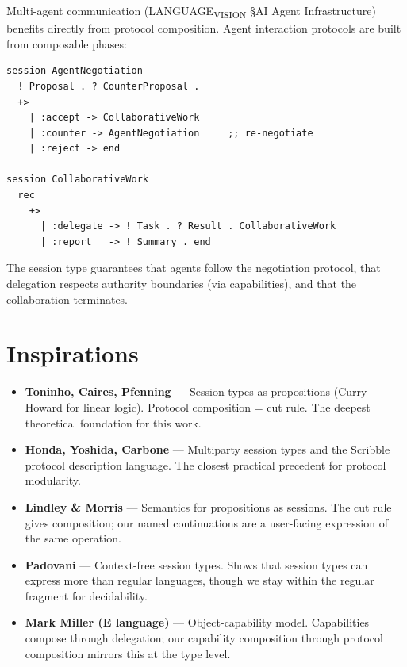 \documentclass[11pt]{article}
\begin{document}
Multi-agent communication (LANGUAGE\textsubscript{VISION} §AI Agent Infrastructure) benefits
directly from protocol composition. Agent interaction protocols are built from
composable phases:

\begin{verbatim}
session AgentNegotiation
  ! Proposal . ? CounterProposal .
  +>
    | :accept -> CollaborativeWork
    | :counter -> AgentNegotiation     ;; re-negotiate
    | :reject -> end

session CollaborativeWork
  rec
    +>
      | :delegate -> ! Task . ? Result . CollaborativeWork
      | :report   -> ! Summary . end
\end{verbatim}

The session type guarantees that agents follow the negotiation protocol, that
delegation respects authority boundaries (via capabilities), and that the
collaboration terminates.
\section{Inspirations}
\label{sec:orga29a86d}

\begin{itemize}
\item \textbf{Toninho, Caires, Pfenning} --- Session types as propositions (Curry-Howard
for linear logic). Protocol composition = cut rule. The deepest theoretical
foundation for this work.
\item \textbf{Honda, Yoshida, Carbone} --- Multiparty session types and the Scribble
protocol description language. The closest practical precedent for protocol
modularity.
\item \textbf{Lindley \& Morris} --- Semantics for propositions as sessions. The cut rule
gives composition; our named continuations are a user-facing expression
of the same operation.
\item \textbf{Padovani} --- Context-free session types. Shows that session types can
express more than regular languages, though we stay within the regular
fragment for decidability.
\item \textbf{Mark Miller (E language)} --- Object-capability model. Capabilities compose
through delegation; our capability composition through protocol composition
mirrors this at the type level.
\end{itemize}
\end{document}
